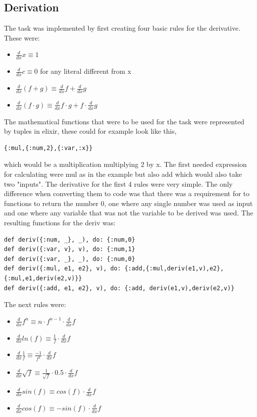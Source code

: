 \documentclass[a4paper,11pt]{article}
\begin{document}
\subsection*{Derivation}
The task was implemented by first creating four basic rules for the derivative. These were: 
\begin{itemize}
    \item $ \frac{d}{dx} x \equiv 1$
    \item $\frac{d}{dx} c \equiv 0$ for any literal different from x
    \item $\frac{d}{dx} (f+g) \equiv \frac{d}{dx} f+ \frac{d}{dx}g$ 
    \item $\frac{d}{dx}(f{\cdot}g) \equiv \frac{d}{dx} f {\cdot} g + f{\cdot}\frac{d}{dx}g$ 
\end{itemize}
\noindent
The mathematical functions that were to be used for the task were represented by tuples in elixir, these could for example look like this, 
\begin{verbatim}
{:mul,{:num,2},{:var,:x}} 
\end{verbatim}
which would be a multiplication multiplying 2 by x. 
The first needed expression for calculating were mul as in the example but also add which would also take two "inputs".
The derivative for the first 4 rules were very simple. The only difference when converting them to code was that there was a requirement for to functions to return the number 0, one where any single number was used as input and one where any variable that was not the variable to be derived was used. 
The resulting functions for the deriv was:
\begin{verbatim}
def deriv({:num, _}, _), do: {:num,0}
def deriv({:var, v}, v), do: {:num,1}
def deriv({:var, _}, _), do: {:num,0}
def deriv({:mul, e1, e2}, v), do: {:add,{:mul,deriv(e1,v),e2},{:mul,e1,deriv(e2,v)}}
def deriv({:add, e1, e2}, v), do: {:add, deriv(e1,v),deriv(e2,v)}
\end{verbatim}
The next rules were:
\begin{itemize}
     

    \item $\frac{d}{dx}f^n \equiv n \cdot f^{n-1} \cdot \frac{d}{dx}f$ 
    \item $\frac{d}{dx}ln(f) \equiv \frac{1}{f} \cdot \frac{d}{dx}f$
    \item $\frac{d}{dx} \frac{1}{f} \equiv \frac{-1}{f^2} \cdot \frac{d}{dx}f$
    \item $\frac{d}{dx} \sqrt{f} \equiv \frac{1}{\sqrt{f}} \cdot0.5 \cdot \frac{d}{dx}f$
    \item $\frac{d}{dx} sin(f) \equiv cos(f) \cdot \frac{d}{dx}f$
    \item $\frac{d}{dx} cos(f) \equiv -sin(f) \cdot \frac{d}{dx}f$

\end{itemize}
\end{document}
